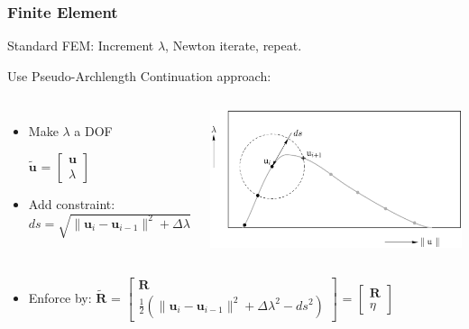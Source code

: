 \documentclass{beamer}
\newcommand{\norm}[1]{\lVert#1\rVert}
\begin{document}
\begin{frame}
\frametitle{\large Finite Element}
Standard FEM: Increment $\lambda$, Newton iterate, repeat.


Use Pseudo-Archlength Continuation approach:
\begin{columns}

\begin{itemize}
	\item Make $\lambda$ a DOF 
	\begin{center}
	$\tilde{\mathbf{u}}$ = 
	$\begin{bmatrix}
	  \mathbf{u} \\ 
	  \lambda 
	\end{bmatrix} $
	\end{center}
	\item Add constraint: \footnotesize $ ds = \sqrt{ \norm{\mathbf{u}_{i} - \mathbf{u}_{i - 1}}^2 + \Delta \lambda}$
	\normalsize	
\end{itemize}

\begin{center}
	 \includegraphics[width = \textwidth]{myFigures/PACA}
\end{center}
\end{columns}
\begin{itemize}
	\item Enforce by: \footnotesize
	$\tilde{\mathbf{R}}$ = 	
	$\begin{bmatrix}
	  \mathbf{R} \\ 
	  \frac{1}{2}(\norm{\mathbf{u}_{i} - \mathbf{u}_{i-1}}^2 + \Delta \lambda ^2 - ds^2)
	\end{bmatrix} $  = 
		$\begin{bmatrix}
	  \mathbf{R} \\ 
	  \eta
	\end{bmatrix} $ 
	\normalsize
	

\end{itemize}
\end{frame}
\end{document}
